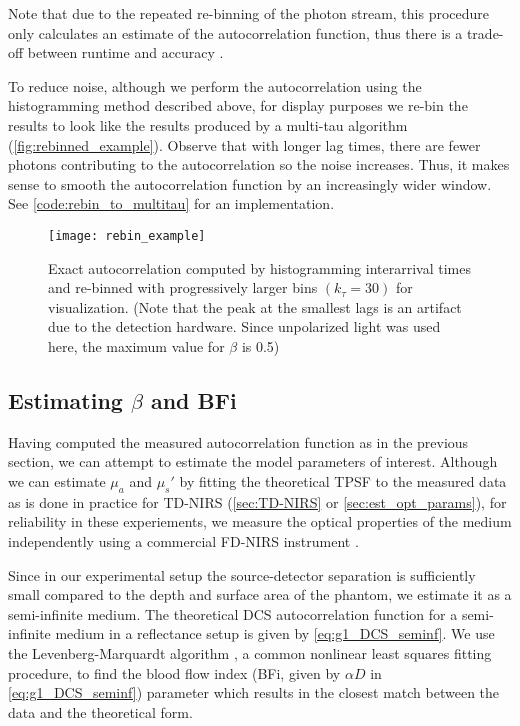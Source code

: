 Note that due to the repeated re-binning of the photon stream, this procedure only calculates an estimate of the autocorrelation function, thus there is a trade-off between runtime and accuracy \cite{Magatti2001}. 

To reduce noise, although we perform the autocorrelation using the histogramming method described above, for display purposes we re-bin the results to look like the results produced by a multi-tau algorithm (\autoref{fig:rebinned_example}). Observe that with longer lag times, there are fewer photons contributing to the autocorrelation so the noise increases. Thus, it makes sense to smooth the autocorrelation function by an increasingly wider window. See \autoref{code:rebin_to_multitau} for an implementation.

\begin{figure}[tb]
\texttt{[image: rebin\_example]}
\centering
\caption{Exact autocorrelation computed by histogramming interarrival times and re-binned with progressively larger bins $(k_\tau=30)$ for visualization. (Note that the peak at the smallest lags is an artifact due to the detection hardware. Since unpolarized light was used here, the maximum value for $\beta$ is 0.5)}
\label{fig:rebinned_example}
\end{figure}


\subsection{Estimating $\beta$ and BFi} \label{sec:fit_beta_bfi}
Having computed the measured autocorrelation function as in the previous section, we can attempt to estimate the model parameters of interest. Although we can estimate $\mu_a$ and $\mu_s'$ by fitting the theoretical TPSF to the measured data as is done in practice for TD-NIRS (\autoref{sec:TD-NIRS} or \autoref{sec:est_opt_params}), for reliability in these experiements, we measure the optical properties of the medium independently using a commercial FD-NIRS instrument \cite{MetaOx}.

Since in our experimental setup the source-detector separation is sufficiently small compared to the depth and surface area of the phantom, we estimate it as a semi-infinite medium. The theoretical DCS autocorrelation function for a semi-infinite medium in a reflectance setup is given by \autoref{eq:g1_DCS_seminf}. We use the Levenberg-Marquardt algorithm \cite{More1978}, a common nonlinear least squares fitting procedure, to find the blood flow index (BFi, given by $\alpha D$ in \autoref{eq:g1_DCS_seminf}) parameter which results in the closest match between the data and the theoretical form. 

